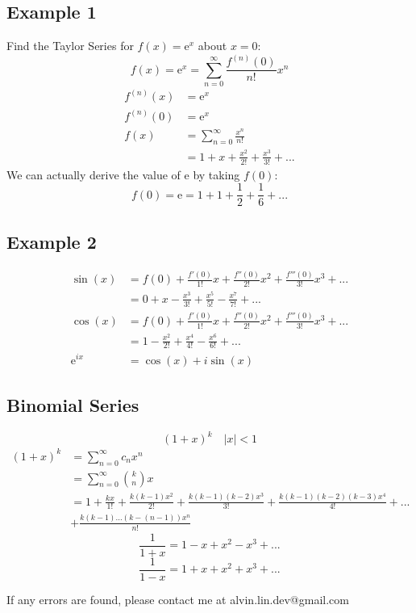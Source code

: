 \documentclass[letterpaper, 12pt]{article}
\newcommand*{\e}{\mathrm{e}}
\begin{document}
\subsection*{Example 1}
Find the Taylor Series for \( f(x)= \e^{x} \) about \( x = 0 \):
\[ f(x) = \e^{x} = \sum_{n=0}^{\infty}\frac{f^{(n)}(0)}{n!}x^{n} \]
\begin{align*}
  f^{(n)}(x) &= \e^{x} \\
  f^{(n)}(0) &= \e^{x} \\
  f(x) &= \sum_{n=0}^{\infty}\frac{x^{n}}{n!} \\
  &= 1+x+\frac{x^{2}}{2!}+\frac{x^{3}}{3!}+...
\end{align*}
We can actually derive the value of \( \e \) by taking \( f(0) \):
\[ f(0) = \e = 1+1+\frac{1}{2}+\frac{1}{6}+... \]

\subsection*{Example 2}
\begin{align*}
  \sin(x) &= f(0)+\frac{f'(0)}{1!}x+\frac{f''(0)}{2!}x^{2}+
    \frac{f'''(0)}{3!}x^{3}+... \\
  &= 0+x-\frac{x^{3}}{3!}+\frac{x^{5}}{5!}-\frac{x^{7}}{7!}+... \\
  \cos(x) &= f(0)+\frac{f'(0)}{1!}x+\frac{f''(0)}{2!}x^{2}+
    \frac{f'''(0)}{3!}x^{3}+... \\
  &= 1-\frac{x^{2}}{2!}+\frac{x^{4}}{4!}-\frac{x^{6}}{6!}+... \\
  \e^{ix} &= \cos(x)+i\sin(x)
\end{align*}

\subsection*{Binomial Series}
\[ (1+x)^{k} \quad |x| < 1 \]
\begin{align*}
  (1+x)^{k} &= \sum_{n=0}^{\infty}c_{n}x^{n} \\
  &= \sum_{n=0}^{\infty}\binom{k}{n}x \\
  &= 1+\frac{kx}{1!}+\frac{k(k-1)x^{2}}{2!}+\frac{k(k-1)(k-2)x^{3}}{3!}+
    \frac{k(k-1)(k-2)(k-3)x^{4}}{4!}+... \\
  & +\frac{k(k-1)...(k-(n-1))x^{n}}{n!}
\end{align*}
\[ \frac{1}{1+x} = 1-x+x^{2}-x^{3}+... \]
\[ \frac{1}{1-x} = 1+x+x^{2}+x^{3}+... \]

\begin{center}
  If any errors are found, please contact me at alvin.lin.dev@gmail.com
\end{center}
\end{document}
